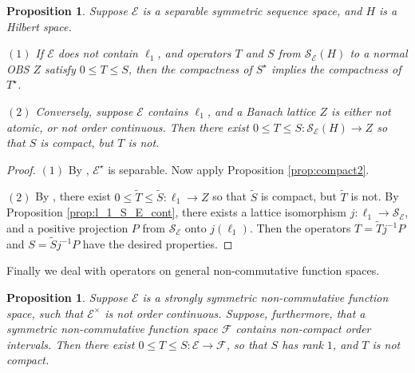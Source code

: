 \documentclass[12pt]{amsart}
\theoremstyle{plain}
\newtheorem{proposition}[theorem]{Proposition}
\theoremstyle{definition}
\renewcommand{\leq}{\leqslant}
\renewcommand{\geq}{\geqslant}\usepackage{amssymb}
\newcommand{\one}{\mathbf{1}}
\newcommand{\is}{\mathcal S}
\newcommand{\ce}{\mathcal E}
\newcommand{\se}{{\mathcal S}_{\mathcal{E}}}
\def \tr{{\mathrm{Tr}} }
\begin{document}
\begin{proposition}\label{prop:compact}
Suppose $\ce$ is a separable symmetric sequence space,
and $H$ is a Hilbert space.

$(1)$
If $\ce$ does not contain $\ell_1$, and operators $T$ and $S$ from $\se(H)$
to a normal OBS $Z$ satisfy $0 \leq T \leq S$, then the compactness of
$S^\star$ implies the compactness of $T^\star$.

$(2)$
Conversely, suppose $\ce$ contains $\ell_1$,
and a Banach lattice $Z$ is either not atomic, or not order continuous.
Then there exist $0 \leq T \leq S : \se(H) \to Z$ so that
$S$ is compact, but $T$ is not.
\end{proposition}


\begin{proof}%
$(1)$
By \cite[Theorem 1.c.9]{LT1}, $\ce^\star$ is separable.
Now apply Proposition \ref{prop:compact2}.

$(2)$
By \cite{Wi},
there exist $0 \leq \tilde{T} \leq \tilde{S} : \ell_1 \to Z$
so that $\tilde{S}$ is compact, but $\tilde{T}$ is not. By
Proposition \ref{prop:l_1_S_E_cont}, there exists a lattice
isomorphism $j : \ell_1 \to \se$, and a positive projection $P$
from $\se$ onto $j(\ell_1)$. Then the operators $T = \tilde{T} j^{-1} P$
and $S = \tilde{S} j^{-1} P$ have the desired properties.
\end{proof}



Finally we deal with operators on general non-commutative function spaces.

\begin{proposition}\label{prop:no OC*}
Suppose $\ce$ is a strongly symmetric non-commutative function space, such that
$\ce^\times$ is not order continuous. Suppose, furthermore, that a
symmetric non-commutative function space ${\mathcal{F}}$ contains
non-compact order intervals. Then there exist
$0 \leq T \leq S : \ce \to {\mathcal{F}}$, so that
$S$ has rank $1$, and $T$ is not compact.
\end{proposition}
\end{document}
